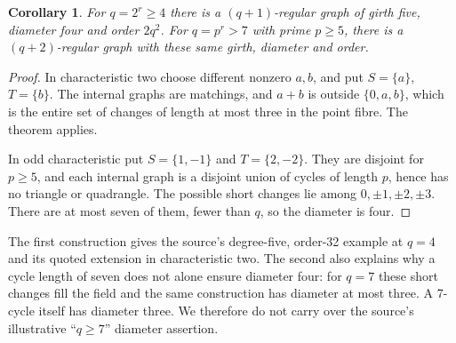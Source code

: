 \documentclass[11pt,a4paper]{article}
\newtheorem{corollary}[theorem]{Corollary}
\begin{document}
\begin{corollary}\label{cor:additive}
For $q=2^r\geq4$ there is a $(q+1)$-regular graph of girth five,
diameter four and order $2q^2$. For $q=p^r>7$ with prime $p\geq5$,
there is a $(q+2)$-regular graph with these same girth, diameter and order.
\end{corollary}
\begin{proof}
In characteristic two choose different nonzero $a,b$, and put
$S=\{a\}$, $T=\{b\}$. The internal graphs are matchings, and
$a+b$ is outside $\{0,a,b\}$, which is the entire set of changes
of length at most three in the point fibre. The theorem applies.

In odd characteristic put $S=\{1,-1\}$ and $T=\{2,-2\}$.
They are disjoint for $p\geq5$, and each internal graph is a disjoint
union of cycles of length $p$, hence has no triangle or quadrangle.
The possible short changes lie among $0,\pm1,\pm2,\pm3$.
There are at most seven of them, fewer than $q$, so the diameter is four.
\end{proof}

The first construction gives the source's degree-five, order-32
example at $q=4$ and its quoted extension in characteristic two.
The second also explains why a cycle length of seven does not
alone ensure diameter four: for $q=7$ these short changes fill the
field and the same construction has diameter at most three.
A 7-cycle itself has diameter three. We therefore do not carry over
the source's illustrative ``$q\geq7$'' diameter assertion.
\end{document}
